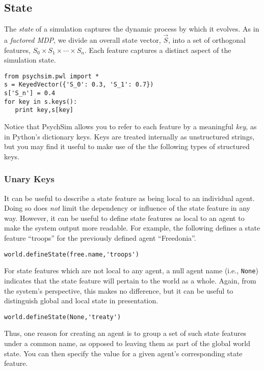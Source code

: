 \documentclass{article}
\begin{document}
\subsection{State}
The {\em state} of a simulation captures the dynamic process by which it evolves. As in a {\em factored MDP}, we divide an overall state vector, $\vec S$, into a set of orthogonal features, $S_0\times S_1\times\cdots\times S_n$. Each feature captures a distinct aspect of the simulation state. 

\begin{verbatim}
from psychsim.pwl import *
s = KeyedVector({'S_0': 0.3, 'S_1': 0.7})
s['S_n'] = 0.4
for key in s.keys():
   print key,s[key]
\end{verbatim}

Notice that PsychSim allows you to refer to each feature by a meaningful {\em key}, as in Python's dictionary keys. Keys are treated internally as unstructured strings, but you may find it useful to make use of the the following types of structured keys.

\subsubsection{Unary Keys}
It can be useful to describe a state feature as being local to an individual agent. Doing so does {\em not} limit the dependency or influence of the state feature in any way. However, it can be useful to define state features as local to an agent to make the system output more readable. For example, the following defines a state feature ``troops'' for the previously defined agent ``Freedonia''.

\begin{verbatim}
world.defineState(free.name,'troops')
\end{verbatim}

For state features which are not local to any agent, a null agent name (i.e., {\tt None}) indicates that the state feature will pertain to the world as a whole. Again, from the system's perspective, this makes no difference, but it can be useful to distinguish global and local state in presentation.

\begin{verbatim}
world.defineState(None,'treaty')
\end{verbatim}

Thus, one reason for creating an agent is to group a set of such state features under a common name, as opposed to leaving them as part of the global world state. You can then specify the value for a given agent's corresponding state feature.
\end{document}
